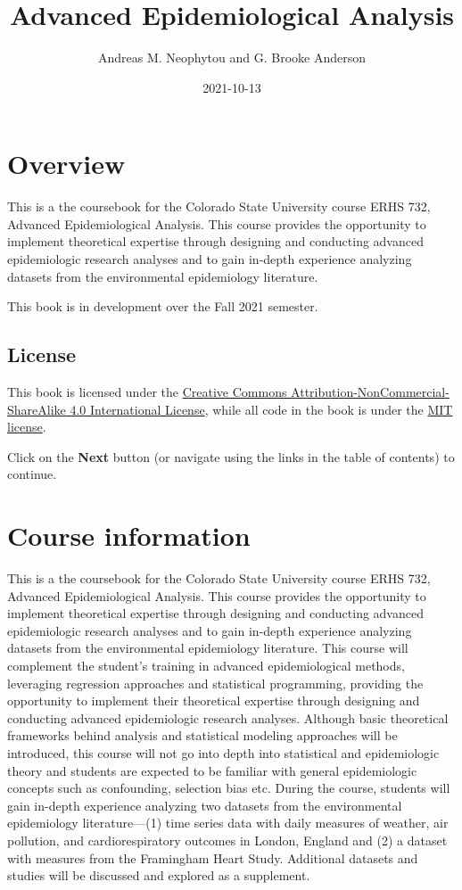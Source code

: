 \documentclass[
]{book}
\title{Advanced Epidemiological Analysis}
\author{Andreas M. Neophytou and G. Brooke Anderson}
\date{2021-10-13}
\begin{document}
\maketitle

{
\setcounter{tocdepth}{1}
\tableofcontents
}
\hypertarget{overview}{%
\chapter{Overview}\label{overview}}

This is a the coursebook for the Colorado State University course ERHS 732,
Advanced Epidemiological Analysis. This course provides the opportunity to
implement theoretical expertise through designing and conducting advanced
epidemiologic research analyses and to gain in-depth experience analyzing
datasets from the environmental epidemiology literature.

This book is in development over the Fall 2021 semester.

\hypertarget{license}{%
\section{License}\label{license}}

This book is licensed under the \href{https://creativecommons.org/licenses/by-nc-sa/4.0/}{Creative Commons
Attribution-NonCommercial-ShareAlike 4.0 International
License}, while all code in
the book is under the \href{https://opensource.org/licenses/MIT}{MIT license}.

Click on the \textbf{Next} button (or navigate using the links in the table of
contents) to continue.

\hypertarget{courseinfo}{%
\chapter{Course information}\label{courseinfo}}

This is a the coursebook for the Colorado State University course ERHS 732,
Advanced Epidemiological Analysis. This course provides the opportunity to
implement theoretical expertise through designing and conducting advanced
epidemiologic research analyses and to gain in-depth experience analyzing
datasets from the environmental epidemiology literature. This course will
complement the student's training in advanced epidemiological methods,
leveraging regression approaches and statistical programming, providing the
opportunity to implement their theoretical expertise through designing and
conducting advanced epidemiologic research analyses. Although basic theoretical frameworks behind analysis and statistical modeling approaches will be introduced, this course will not go into depth into statistical and epidemiologic theory and students are expected to be familiar with general epidemiologic concepts such as confounding, selection bias etc. During the course,
students will gain in-depth experience analyzing two datasets from the
environmental epidemiology literature---(1) time series data with daily measures
of weather, air pollution, and cardiorespiratory outcomes in London, England and
(2) a dataset with measures from the Framingham Heart Study. Additional datasets
and studies will be discussed and explored as a supplement.
\end{document}
